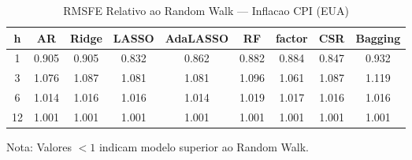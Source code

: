 \begin{table}[ht]
\centering
\caption{RMSFE Relativo ao Random Walk — Inflacao CPI (EUA)}
\label{tab:rmsfe_rw}
\begin{tabular}{ccccccccc}
\hline\hline
h & AR & Ridge & LASSO & AdaLASSO & RF & factor & CSR & Bagging \\
\hline
1 & 0.905 & 0.905 & 0.832 & 0.862 & 0.882 & 0.884 & 0.847 & 0.932 \\
3 & 1.076 & 1.087 & 1.081 & 1.081 & 1.096 & 1.061 & 1.087 & 1.119 \\
6 & 1.014 & 1.016 & 1.016 & 1.014 & 1.019 & 1.017 & 1.016 & 1.016 \\
12 & 1.001 & 1.001 & 1.001 & 1.001 & 1.001 & 1.001 & 1.001 & 1.001 \\
\hline\hline
\end{tabular}
\begin{flushleft}
\footnotesize Nota: Valores $< 1$ indicam modelo superior ao Random Walk.
\end{flushleft}
\end{table}
